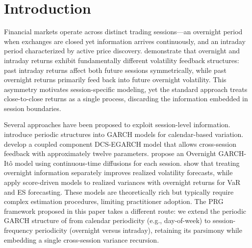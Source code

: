 \documentclass[11pt,a4paper]{article}
\begin{document}
\begin{abstract}
\medskip\noindent
\textbf{Keywords:} Volatility forecasting; Periodic GARCH; Session decomposition; Overnight variance; Cross-session information transfer

\medskip\noindent
\textbf{JEL Classification:} C22, C53, G17
\end{abstract}

\newpage

\section{Introduction}

Financial markets operate across distinct trading sessions---an overnight period when exchanges are closed yet information arrives continuously, and an intraday period characterized by active price discovery. \citet{Blanc2014} demonstrate that overnight and intraday returns exhibit fundamentally different volatility feedback structures: past intraday returns affect both future sessions symmetrically, while past overnight returns primarily feed back into future overnight volatility. This asymmetry motivates session-specific modeling, yet the standard approach treats close-to-close returns as a single process, discarding the information embedded in session boundaries.

Several approaches have been proposed to exploit session-level information. \citet{Bollerslev1996} introduce periodic structures into GARCH models for calendar-based variation. \citet{Linton2020} develop a coupled component DCS-EGARCH model that allows cross-session feedback with approximately twelve parameters. \citet{Kim2023} propose an Overnight GARCH-It\^{o} model using continuous-time diffusions for each session. \citet{Todorova2014} show that treating overnight information separately improves realized volatility forecasts, while \citet{Opschoor2021} apply score-driven models to realized variances with overnight returns for VaR and ES forecasting. These models are theoretically rich but typically require complex estimation procedures, limiting practitioner adoption. The PRG framework proposed in this paper takes a different route: we extend the periodic GARCH structure of \citet{Bollerslev1996} from calendar periodicity (e.g., day-of-week) to session-frequency periodicity (overnight versus intraday), retaining its parsimony while embedding a single cross-session variance recursion.
\end{document}
